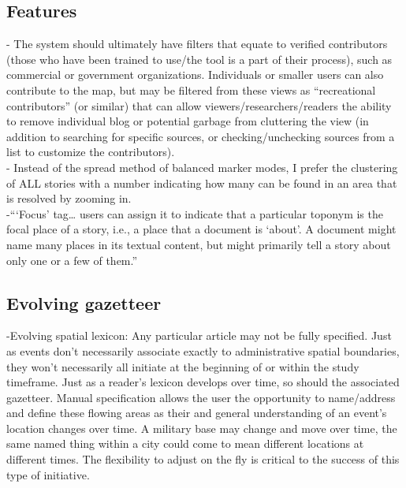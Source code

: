 \subsection{Features}
-{\color{purple} The system should ultimately have filters that equate to verified contributors (those who have been trained to use/the tool is a part of their process), such as commercial or government organizations.  Individuals or smaller users can also contribute to the map, but may be filtered from these views as “recreational contributors” (or similar) that can allow viewers/researchers/readers the ability to remove individual blog or potential garbage from cluttering the view (in addition to searching for specific sources, or checking/unchecking sources from a list to customize the contributors).\cite{Brown2012}}\\
-{\color{purple} Instead of the spread method of balanced marker modes, I prefer the clustering of ALL stories with a number indicating how many can be found in an area that is resolved by zooming in. \cite{Teitler2008}}\\ %
-{\color{orange}“‘Focus’ tag… users can assign it to indicate that a particular toponym is the focal place of a story, i.e., a place that a document is ‘about’. A document might name many places in its textual content, but might primarily tell a story about only one or a few of them.”\cite{Karimzadeh2019}}\\

\subsection{Evolving gazetteer}
-{\color{purple}Evolving spatial lexicon: Any particular article may not be fully specified. Just as events don’t necessarily associate exactly to administrative spatial boundaries, they won’t necessarily all initiate at the beginning of or within the study timeframe.  Just as a reader’s lexicon develops over time, so should the associated gazetteer.  Manual specification allows the user the opportunity to name/address and define these flowing areas as their and general understanding of an event’s location changes over time. A military base may change and move over time, the same named thing within a city could come to mean different locations at different times. The flexibility to adjust on the fly is critical to the success of this type of initiative.\cite{Lieberman2010}}\\

